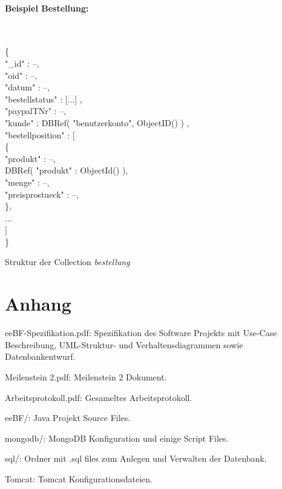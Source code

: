\documentclass[a4paper]{article}
\begin{document}
\paragraph{Beispiel Bestellung:} ~\\

\begin{algorithm}[H]
	
	\{ \\
	\Indp
		"{}\_id"{} : --,\\
		"{}oid"{} : --,\\
		"{}datum"{} : --,\\
		"{}bestellstatus"{} : [...] ,\\
		"{}paypalTNr"{} : --,\\
		"{}kunde"{} : DBRef( "benutzerkonto", ObjectID() ) ,\\
		"{}bestellposition"{} : [ \\ 
		\Indp
			\{ \\
			\Indp
				"{}produkt"{} : --,\\ 
				DBRef( "{}produkt"{} : ObjectId() ), \\
				"{}menge"{} : --,\\
				"{}preisprostueck"{} : --, \\
			\Indm
			\}, \\
			... \\
		\Indm
		] \\
	\Indm \}
	\caption{Struktur der Collection \emph{bestellung}}
	\label{alg:1}
\end{algorithm}


\section*{Anhang}
\begin{description}
	\item eeBF-Spezifikation.pdf: Spezifikation des Software Projekts mit Use-Case Beschreibung, UML-Struktur- und Verhaltensdiagrammen sowie Datenbankentwurf.
	\item Meilenstein 2.pdf: Meilenstein 2 Dokument.
	\item Arbeitsprotokoll.pdf: Gesameltes Arbeitsprotokoll.
	\item eeBF/: Java Projekt Source Files.
	\item mongodb/: MongoDB Konfiguration und einige Script Files.
	\item sql/: Ordner mit .sql files zum Anlegen und Verwalten der Datenbank.
	\item Tomcat: Tomcat Konfigurationsdateien.

\end{description}
\end{document}
